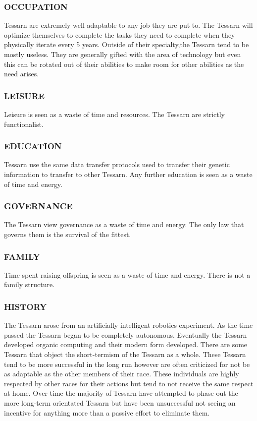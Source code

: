 \subsubsection{OCCUPATION}
Tessarn are extremely well adaptable to any job they are put to.  The Tessarn
will optimize themselves to complete the tasks they need to complete when they
physically iterate every 5 years.  Outside of their specialty,the Tessarn tend
to be mostly useless.  They are generally gifted with the area of technology
but even this can be rotated out of their abilities to make room for other
abilities as the need arises.
\subsubsection{LEISURE}
Leisure is seen as a waste of time and resources.  The Tessarn are strictly
functionalist.
\subsubsection{EDUCATION}
Tessarn use the same data transfer protocols used to transfer their genetic
information to transfer to other Tessarn.  Any further education is seen as a
waste of time and energy.
\subsubsection{GOVERNANCE}
The Tessarn view governance as a waste of time and energy.  The only law that
governs them is the survival of the fittest.
\subsubsection{FAMILY}
Time spent raising offspring is seen as a waste of time and energy.   There is
not a family structure.  
\subsubsection{HISTORY}
The Tessarn arose from an artificially intelligent robotics experiment.  As the
time passed the Tessarn began to be completely autonomous.  Eventually the
Tessarn developed organic computing and their modern form developed.  There are
some Tessarn that object the short-termism of the Tessarn as a whole.  These
Tessarn tend to be more successful in the long run however are often criticized
for not be as adaptable as the other members of their race.  These individuals
are highly respected by other races for their actions but tend to not receive
the same respect at home.  Over time the majority of Tessarn have attempted to
phase out the more long-term orientated Tessarn but have been unsuccessful not
seeing an incentive for anything more than a passive effort to eliminate them.
